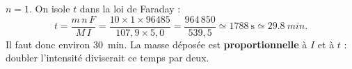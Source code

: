 \documentclass[11pt,a4paper]{article}
\begin{document}
\begin{corr}
$n=1$. On isole $t$ dans la loi de Faraday :
\[
t = \frac{m\,n\,F}{M\,I} = \frac{10\times 1\times 96485}{107{,}9\times 5{,}0}
= \frac{964\,850}{539{,}5} \simeq \boxed{1788\ \mathrm{s}} \simeq \SI{29.8}{min}.
\]
Il faut donc environ \SI{30}{min}. La masse déposée est \textbf{proportionnelle} à $I$ et à $t$ :
doubler l'intensité diviserait ce temps par deux.
\end{corr}
\end{document}
